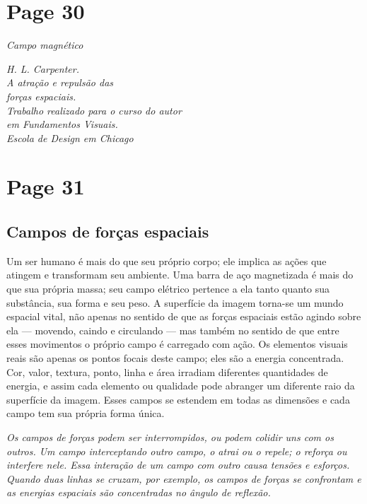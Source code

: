 \documentclass[a4paper]{article}
\begin{document}
\newpage
\section*{Page 30}

\textit{Campo magnético}

\textit{H. L. Carpenter.}\\
\textit{A atração e repulsão das}\\
\textit{forças espaciais.}\\
\textit{Trabalho realizado para o curso do autor}\\
\textit{em Fundamentos Visuais.}\\
\textit{Escola de Design em Chicago}

\vfill
{}

\newpage
\section*{Page 31}

\subsection*{Campos de forças espaciais}

Um ser humano é mais do que seu próprio corpo; ele implica as ações que
atingem e transformam seu ambiente. Uma barra de aço magnetizada é mais do que sua
própria massa; seu campo elétrico pertence a ela tanto quanto sua substância, sua
forma e seu peso. A superfície da imagem torna-se um mundo espacial vital, não apenas
no sentido de que as forças espaciais estão agindo sobre ela --- movendo, caindo e circulando
--- mas também no sentido de que entre esses movimentos o próprio campo é carregado com
ação. Os elementos visuais reais são apenas os pontos focais deste campo; eles são
a energia concentrada. Cor, valor, textura, ponto, linha e área irradiam diferentes
quantidades de energia, e assim cada elemento ou qualidade pode abranger um diferente
raio da superfície da imagem. Esses campos se estendem em todas as dimensões e cada
campo tem sua própria forma única.

\textit{Os campos de forças podem ser interrompidos, ou
podem colidir uns com os outros. Um campo interceptando outro campo, o atrai ou o repele; o
reforça ou interfere nele. Essa interação
de um campo com outro causa tensões e
esforços. Quando duas linhas se cruzam, por exemplo, os
campos de forças se confrontam e as energias espaciais são
concentradas no ângulo de reflexão.}
\end{document}
